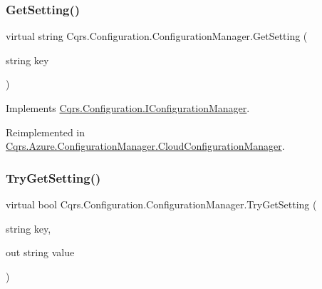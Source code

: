 \subsubsection{\texorpdfstring{Get\+Setting()}{GetSetting()}}
{\footnotesize\ttfamily virtual string Cqrs.\+Configuration.\+Configuration\+Manager.\+Get\+Setting (\begin{DoxyParamCaption}\item[{string}]{key }\end{DoxyParamCaption})\hspace{0.3cm}{\ttfamily [virtual]}}



Implements \hyperlink{interfaceCqrs_1_1Configuration_1_1IConfigurationManager_a9f7b7d4d8c26a0589f01c8a7f69901ef_a9f7b7d4d8c26a0589f01c8a7f69901ef}{Cqrs.\+Configuration.\+I\+Configuration\+Manager}.



Reimplemented in \hyperlink{classCqrs_1_1Azure_1_1ConfigurationManager_1_1CloudConfigurationManager_a48228b7e2204a2449426de32cd6ecc65_a48228b7e2204a2449426de32cd6ecc65}{Cqrs.\+Azure.\+Configuration\+Manager.\+Cloud\+Configuration\+Manager}.

\mbox{\label{classCqrs_1_1Configuration_1_1ConfigurationManager_ad87af2a011af065d6d3e0d2ff01c7f6e_ad87af2a011af065d6d3e0d2ff01c7f6e}} 
\subsubsection{\texorpdfstring{Try\+Get\+Setting()}{TryGetSetting()}\hspace{0.1cm}{\footnotesize\ttfamily [1/2]}}
{\footnotesize\ttfamily virtual bool Cqrs.\+Configuration.\+Configuration\+Manager.\+Try\+Get\+Setting (\begin{DoxyParamCaption}\item[{string}]{key,  }\item[{out string}]{value }\end{DoxyParamCaption})\hspace{0.3cm}{\ttfamily [virtual]}}



